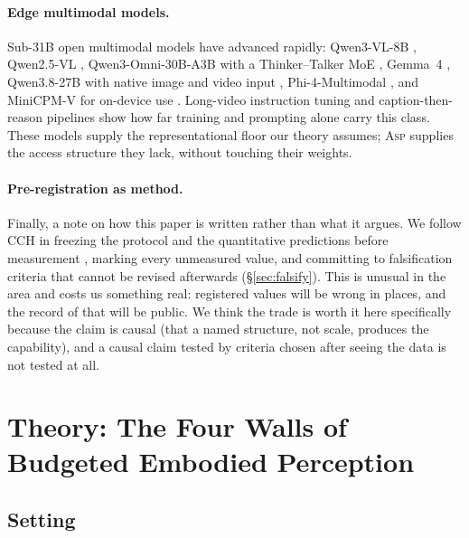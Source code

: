 \documentclass[10pt]{article}
\theoremstyle{definition}
\theoremstyle{plain}
\newcommand{\ASP}{\textsc{Asp}}
\begin{document}
\paragraph{Edge multimodal models.}
Sub-31B open multimodal models have advanced rapidly: Qwen3-VL-8B \citep{qwen3vl}, Qwen2.5-VL \citep{qwen25vl}, Qwen3-Omni-30B-A3B with a Thinker--Talker MoE \citep{qwen3omni}, Gemma~4 \citep{gemma4}, Qwen3.8-27B with native image and video input \citep{qwen38}, Phi-4-Multimodal \citep{phi4mm}, and MiniCPM-V for on-device use \citep{minicpmv}. Long-video instruction tuning \citep{longvitu} and caption-then-reason pipelines \citep{socratic,alanavlm} show how far training and prompting alone carry this class. These models supply the representational floor our theory assumes; \ASP{} supplies the access structure they lack, without touching their weights.

\paragraph{Pre-registration as method.}
Finally, a note on how this paper is written rather than what it argues. We follow CCH in freezing the protocol and the quantitative predictions before measurement \citep{cch}, marking every unmeasured value, and committing to falsification criteria that cannot be revised afterwards (\S\ref{sec:falsify}). This is unusual in the area and costs us something real: registered values will be wrong in places, and the record of that will be public. We think the trade is worth it here specifically because the claim is causal (that a named structure, not scale, produces the capability), and a causal claim tested by criteria chosen after seeing the data is not tested at all.


\section{Theory: The Four Walls of Budgeted Embodied Perception}
\label{sec:theory}

\subsection{Setting}
\end{document}
